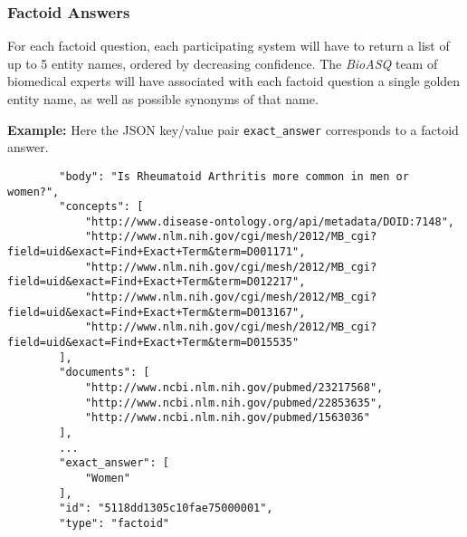 \subsubsection{Factoid Answers}
\begin{displayquote}
For each factoid question, each participating system will have to return a list of up to 5 entity names,
ordered by decreasing confidence. The \emph{BioASQ} team of biomedical experts will have associated with
each factoid question a single golden entity name, as well as possible synonyms of that name.
\end{displayquote}
\textbf{Example:} Here the JSON key/value pair \verb|exact_answer| corresponds to a factoid answer.  
\small
\begin{verbatim}
        "body": "Is Rheumatoid Arthritis more common in men or women?", 
        "concepts": [
            "http://www.disease-ontology.org/api/metadata/DOID:7148", 
            "http://www.nlm.nih.gov/cgi/mesh/2012/MB_cgi?field=uid&exact=Find+Exact+Term&term=D001171", 
            "http://www.nlm.nih.gov/cgi/mesh/2012/MB_cgi?field=uid&exact=Find+Exact+Term&term=D012217", 
            "http://www.nlm.nih.gov/cgi/mesh/2012/MB_cgi?field=uid&exact=Find+Exact+Term&term=D013167", 
            "http://www.nlm.nih.gov/cgi/mesh/2012/MB_cgi?field=uid&exact=Find+Exact+Term&term=D015535"
        ], 
        "documents": [
            "http://www.ncbi.nlm.nih.gov/pubmed/23217568", 
            "http://www.ncbi.nlm.nih.gov/pubmed/22853635", 
            "http://www.ncbi.nlm.nih.gov/pubmed/1563036"
        ], 
        ...
        "exact_answer": [
            "Women"
        ], 
        "id": "5118dd1305c10fae75000001",  
        "type": "factoid"
\end{verbatim}
\normalsize
